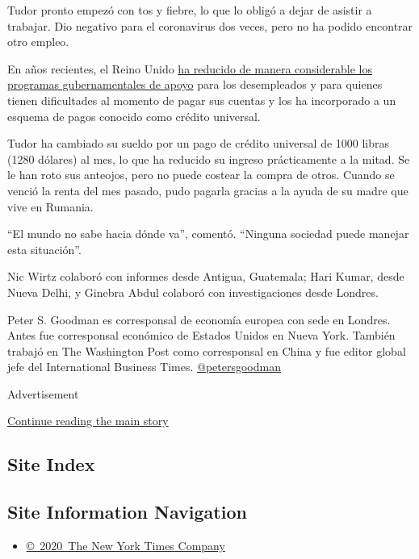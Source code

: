 Tudor pronto empezó con tos y fiebre, lo que lo obligó a dejar de
asistir a trabajar. Dio negativo para el coronavirus dos veces, pero no
ha podido encontrar otro empleo.

En años recientes, el Reino Unido
\href{https://www.nytimes.com/2018/05/28/world/europe/uk-austerity-poverty.html}{ha
reducido de manera considerable los programas gubernamentales de apoyo}
para los desempleados y para quienes tienen dificultades al momento de
pagar sus cuentas y los ha incorporado a un esquema de pagos conocido
como crédito universal.

Tudor ha cambiado su sueldo por un pago de crédito universal de 1000
libras (1280 dólares) al mes, lo que ha reducido su ingreso
prácticamente a la mitad. Se le han roto sus anteojos, pero no puede
costear la compra de otros. Cuando se venció la renta del mes pasado,
pudo pagarla gracias a la ayuda de su madre que vive en Rumania.

``El mundo no sabe hacia dónde va'', comentó. ``Ninguna sociedad puede
manejar esta situación''.

Nic Wirtz colaboró con informes desde Antigua, Guatemala; Hari Kumar,
desde Nueva Delhi, y Ginebra Abdul colaboró con investigaciones desde
Londres.

Peter S. Goodman es corresponsal de economía europea con sede en
Londres. Antes fue corresponsal económico de Estados Unidos en Nueva
York. También trabajó en The Washington Post como corresponsal en China
y fue editor global jefe del International Business Times.
\href{https://twitter.com/petersgoodman}{@petersgoodman}

Advertisement

\protect\hyperlink{after-bottom}{Continue reading the main story}

\hypertarget{site-index}{%
\subsection{Site Index}\label{site-index}}

\hypertarget{site-information-navigation}{%
\subsection{Site Information
Navigation}\label{site-information-navigation}}

\begin{itemize}
\tightlist
\item
  \href{https://help.nytimes.com/hc/en-us/articles/115014792127-Copyright-notice}{©~2020~The
  New York Times Company}
\end{itemize}

